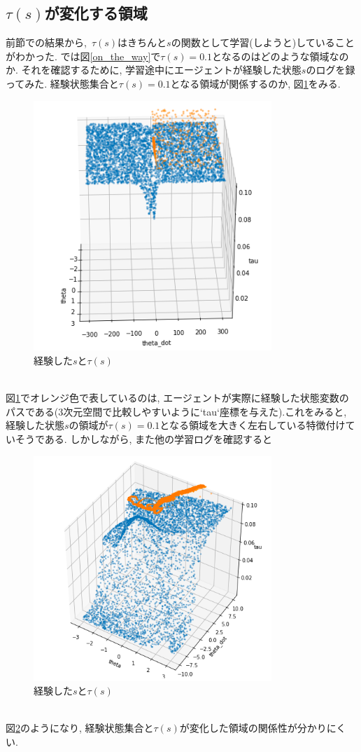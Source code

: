 \documentclass{jsarticle}
\begin{document}
\subsection{$\tau(s)$が変化する領域}
前節での結果から,~$\tau(s)$はきちんと$s$の関数として学習(しようと)していることがわかった. では図\ref{on_the_way}で$\tau(s)=0.1$となるのはどのような領域なのか. それを確認するために, 学習途中にエージェントが経験した状態$s$のログを録ってみた. 経験状態集合と$\tau(s)=0.1$となる領域が関係するのか, 図\ref{state_log_and_tau2}をみる.
\begin{figure}[h]
	\centering
 	\includegraphics[width=9cm]{state_log_and_tau2.png}
 	\caption{経験した$s$と$\tau(s)$}  \label{state_log_and_tau2}
\end{figure}\\
図\ref{state_log_and_tau2}でオレンジ色で表しているのは, エージェントが実際に経験した状態変数のパスである(3次元空間で比較しやすいように`tau`座標を与えた).これをみると, 経験した状態$s$の領域が$\tau(s)=0.1$となる領域を大きく左右している特徴付けていそうである. しかしながら, また他の学習ログを確認すると
\begin{figure}[h]
	\centering
 	\includegraphics[width=9cm]{state_log_and_tau3.png}
 	\caption{経験した$s$と$\tau(s)$}  \label{state_log_and_tau3}
\end{figure}\\
図\ref{state_log_and_tau3}のようになり, 経験状態集合と$\tau(s)$が変化した領域の関係性が分かりにくい.
\fi
\end{document}
